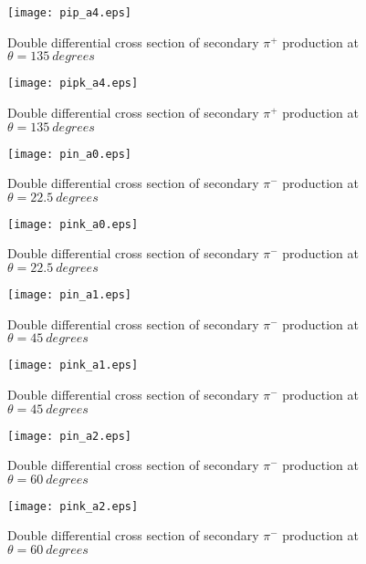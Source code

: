 \documentclass[12pt]{article}
\begin{document}
\begin{figure}[htbp]
\caption{Double differential cross section of secondary $\pi^+$ production at $\theta = 135~degrees$}
\label{figpip4} 
\centerline{\texttt{[image: pip\_a4.eps]}}
\end{figure}

\begin{figure}[htbp]
\caption{Double differential cross section of secondary $\pi^+$ production at $\theta = 135~degrees$}
\label{figpipk4} 
\centerline{\texttt{[image: pipk\_a4.eps]}}
\end{figure}

\clearpage

\begin{figure}[htbp]
\caption{Double differential cross section of secondary $\pi^-$ production at $\theta = 22.5~degrees$}
\label{figpin0} 
\centerline{\texttt{[image: pin\_a0.eps]}}
\end{figure}

\begin{figure}[htbp]
\caption{Double differential cross section of secondary $\pi^-$ production at $\theta = 22.5~degrees$}
\label{figpink0} 
\centerline{\texttt{[image: pink\_a0.eps]}}
\end{figure}

\begin{figure}[htbp]
\caption{Double differential cross section of secondary $\pi^-$ production at $\theta = 45~degrees$}
\label{figpin1} 
\centerline{\texttt{[image: pin\_a1.eps]}}
\end{figure}

\begin{figure}[htbp]
\caption{Double differential cross section of secondary $\pi^-$ production at $\theta = 45~degrees$}
\label{figpink1} 
\centerline{\texttt{[image: pink\_a1.eps]}}
\end{figure}

\begin{figure}[htbp]
\caption{Double differential cross section of secondary $\pi^-$ production at $\theta = 60~degrees$}
\label{figpin2} 
\centerline{\texttt{[image: pin\_a2.eps]}}
\end{figure}

\begin{figure}[htbp]
\caption{Double differential cross section of secondary $\pi^-$ production at $\theta = 60~degrees$}
\label{figpink2} 
\centerline{\texttt{[image: pink\_a2.eps]}}
\end{figure}
\end{document}
